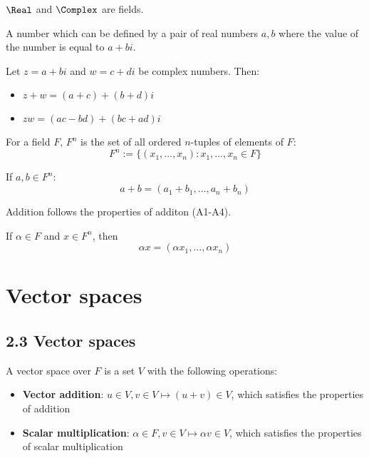 \begin{theorem}
  $\Real$ and $\Complex$ are fields.
\end{theorem}

\begin{definition}
  A number which can be defined by a pair of real numbers $a, b$ where the value of the number is equal to $a + bi$.
\end{definition}

\begin{theorem}
  Let $z = a + bi$ and $w = c + di$ be complex numbers. Then:
  \begin{itemize}
    \item $z + w = (a + c) + (b + d)i$
    \item $zw = (ac - bd) + (bc + ad)i$
  \end{itemize}
\end{theorem}

\begin{definition}[$F^n$] For a field $F$, $F^n$ is the set of all ordered $n$-tuples of elements of $F$:
  \[
    F^n := \{ (x_1, \ldots, x_n) : x_1, \ldots, x_n \in F \}
  \]
\end{definition}

\begin{definition}[Addition in $F^n$] If $a, b \in F^n$:
  \[
    a + b = (a_1 + b_1, \ldots, a_n + b_n)
  \]

  Addition follows the properties of additon (A1-A4).
\end{definition}

\begin{definition} If $\alpha \in F$ and $x \in F^n$, then
  \[
    \alpha x = (\alpha x_1, \ldots, \alpha x_n)
  \]
\end{definition}

\section{Vector spaces}

\subsection*{2.3 Vector spaces}

\begin{definition} A vector space over $F$ is a set $V$ with the following operations:
  \begin{itemize}
    \item \textbf{Vector addition}: $u \in V, v \in V \mapsto (u + v) \in V$, which satisfies the properties of addition
    \item \textbf{Scalar multiplication}: $\alpha \in F, v \in V \mapsto \alpha v \in V$, which satisfies the properties of scalar multiplication
  \end{itemize}
\end{definition}

